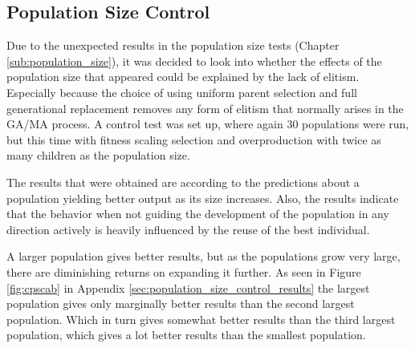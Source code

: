 \subsection{Population Size Control} %
\label{sub:population_size_control}

Due to the unexpected results in the population size tests (Chapter \ref{sub:population_size}), it was decided to look into whether the effects of the population size that appeared could be explained by the lack of elitism. Especially because the choice of using uniform parent selection and full generational replacement removes any form of elitism that normally arises in the GA/MA process. A control test was set up, where again 30 populations were run, but this time with fitness scaling selection and overproduction with twice as many children as the population size.

The results that were obtained are according to the predictions about a population yielding better output as its size increases. Also, the results indicate that the behavior when not guiding the development of the population in any direction actively is heavily influenced by the reuse of the best individual. 

A larger population gives better results, but as the populations grow very large, there are diminishing returns on expanding it further. As seen in Figure \ref{fig:cpscab} in Appendix \ref{sec:population_size_control_results} the largest population gives only marginally better results than the second largest population. Which in turn gives somewhat better results than the third largest population, which gives a lot better results than the smallest population.



